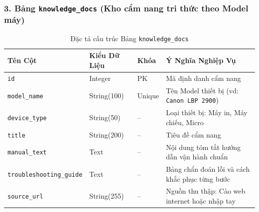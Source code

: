 \documentclass[11pt,a4paper]{article}
\begin{document}
\subsubsection{3. Bảng \texttt{knowledge\_docs} (Kho cẩm nang tri thức theo Model máy)}
\begin{table}[H]
\centering
\small
\begin{tabularx}{\textwidth}{l l l X}
\toprule
\textbf{Tên Cột} & \textbf{Kiểu Dữ Liệu} & \textbf{Khóa} & \textbf{Ý Nghĩa Nghiệp Vụ} \\
\midrule
\texttt{id} & Integer & PK & Mã định danh cẩm nang \\
\texttt{model\_name} & String(100) & Unique & Tên Model thiết bị (vd: \texttt{Canon LBP 2900}) \\
\texttt{device\_type} & String(50) & -- & Loại thiết bị: Máy in, Máy chiếu, Micro \\
\texttt{title} & String(200) & -- & Tiêu đề cẩm nang \\
\texttt{manual\_text} & Text & -- & Nội dung tóm tắt hướng dẫn vận hành chuẩn \\
\texttt{troubleshooting\_guide} & Text & -- & Bảng chẩn đoán lỗi và cách khắc phục từng bước \\
\texttt{source\_url} & String(255) & -- & Nguồn thu thập: Cào web internet hoặc nhập tay \\
\bottomrule
\end{tabularx}
\caption{Đặc tả cấu trúc Bảng \texttt{knowledge\_docs}}
\end{table}
\end{document}
